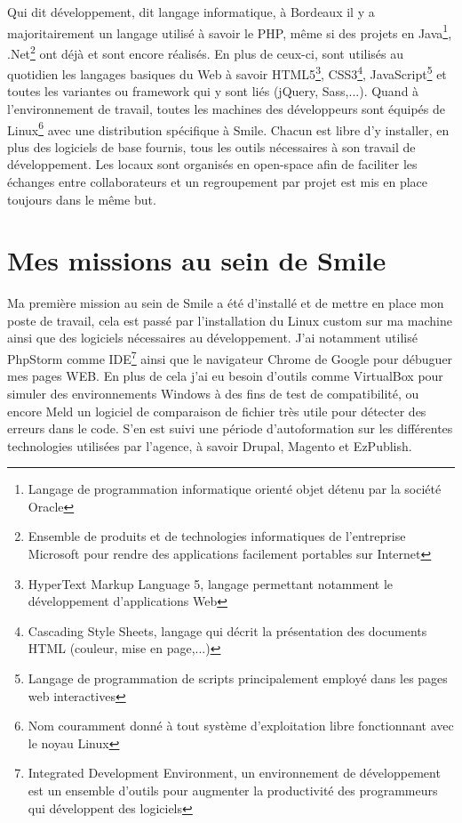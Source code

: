 \documentclass[a4paper,11pt,twoside]{report}
\begin{document}
  Qui dit développement, dit langage informatique, à Bordeaux il y a majoritairement un langage utilisé à savoir le PHP, même si des projets en Java\footnote{ Langage de programmation informatique orienté objet détenu par la société Oracle}, .Net\footnote{Ensemble de produits et de technologies informatiques de l'entreprise Microsoft pour rendre des applications facilement portables sur Internet} ont déjà et sont encore réalisés. En plus de ceux-ci, sont utilisés au quotidien les langages basiques du Web à savoir HTML5\footnote{HyperText Markup Language 5, langage permettant notamment le développement d'applications Web}, CSS3\footnote{Cascading Style Sheets, langage qui décrit la présentation des documents HTML (couleur, mise en page,...)}, JavaScript\footnote{Langage de programmation de scripts principalement employé dans les pages web interactives} et toutes les variantes ou framework qui y sont liés (jQuery, Sass,...). Quand à l'environnement de travail, toutes les machines des développeurs sont équipés de Linux\footnote{Nom couramment donné à tout système d'exploitation libre fonctionnant avec le noyau Linux} avec une distribution spécifique à Smile. Chacun est libre d'y installer, en plus des logiciels de base fournis, tous les outils nécessaires à son travail de développement. Les locaux sont organisés en open-space afin de faciliter les échanges entre collaborateurs et un regroupement par projet est mis en place toujours dans le même but.
  
  \section{Mes missions au sein de Smile}
  Ma première mission au sein de Smile a été d'installé et de mettre en place mon poste de travail, cela est passé par l'installation du Linux custom sur ma machine ainsi que des logiciels nécessaires au développement. J'ai notamment utilisé PhpStorm comme IDE\footnote{Integrated Development Environment, un environnement de développement est un ensemble d'outils pour augmenter la productivité des programmeurs qui développent des logiciels} ainsi que le navigateur Chrome de Google pour débuguer mes pages WEB. En plus de cela j'ai eu besoin d'outils comme VirtualBox pour simuler des environnements Windows à des fins de test de compatibilité, ou encore Meld un logiciel de comparaison de fichier très utile pour détecter des erreurs dans le code. S'en est suivi une période d'autoformation sur les différentes technologies utilisées par l'agence, à savoir Drupal, Magento et EzPublish.\newline 
    
\end{document}
